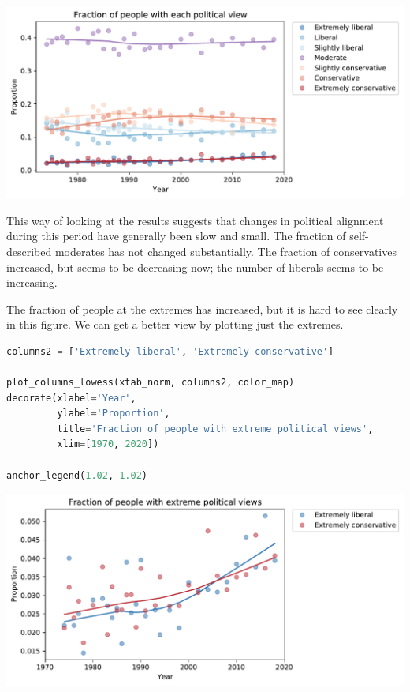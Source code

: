 \begin{center}
\includegraphics[scale=0.75]{chapters/02_polviews_soln_files/02_polviews_soln_91_0.pdf}
\end{center}

This way of looking at the results suggests that changes in political
alignment during this period have generally been slow and small. The
fraction of self-described moderates has not changed substantially. The
fraction of conservatives increased, but seems to be decreasing now; the
number of liberals seems to be increasing.

The fraction of people at the extremes has increased, but it is hard to
see clearly in this figure. We can get a better view by plotting just
the extremes.

\begin{lstlisting}[language=Python]
columns2 = ['Extremely liberal', 'Extremely conservative']

plot_columns_lowess(xtab_norm, columns2, color_map)
decorate(xlabel='Year',
         ylabel='Proportion',
         title='Fraction of people with extreme political views',
         xlim=[1970, 2020])

anchor_legend(1.02, 1.02)
\end{lstlisting}

\begin{center}
\includegraphics[scale=0.75]{chapters/02_polviews_soln_files/02_polviews_soln_93_0.pdf}
\end{center}

